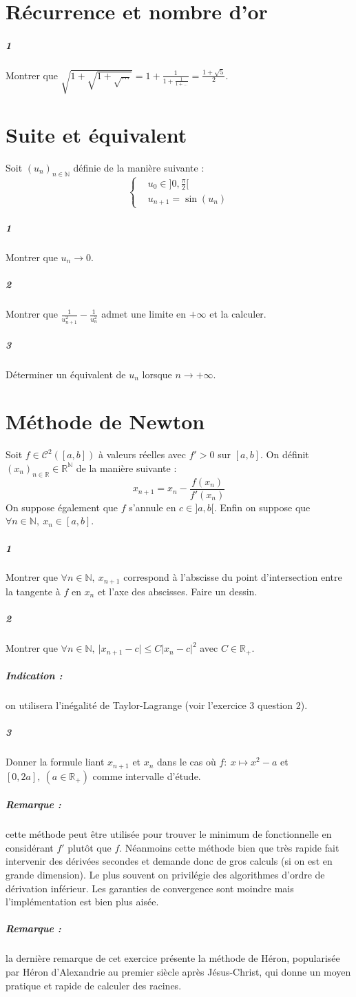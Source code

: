 \documentclass[10pt,a4paper]{article}
\begin{document}
\section{Récurrence et nombre d'or}
\subparagraph{1}Montrer que $\sqrt{1+\sqrt{1+\sqrt{\dots}}}=1+\frac{1}{1+\frac{1}{1+\dots}}=\frac{1+\sqrt{5}}{2}$.
\section{Suite et équivalent}
Soit $(u_n)_{n \in \mathbb{N}}$ définie de la manière suivante :
\begin{equation*}
\left\lbrace
\begin{aligned}
& u_0 \in ]0,\frac{\pi}{2}[\\
& u_{n+1}=\sin(u_n)
\end{aligned}
\right.
\end{equation*}
\subparagraph{1}Montrer que $u_n \rightarrow 0$.
\subparagraph{2}Montrer que $\frac{1}{u_{n+1}^2}-\frac{1}{u_n^2}$ admet une limite en $+\infty$ et la calculer.
\subparagraph{3}Déterminer un équivalent de $u_n$ lorsque $n \rightarrow +\infty$.
\section{Méthode de Newton}
Soit $f \in \mathcal{C}^2([a,b])$ à valeurs réelles avec $f'>0$ sur $[a,b]$. On définit $(x_n)_{n \in \mathbb{R}} \in \mathbb{R}^{\mathbb{N}}$ de la manière suivante :
\begin{equation*}
x_{n+1}=x_n-\frac{f(x_n)}{f'(x_{n})}
\end{equation*}
On suppose également que $f$ s'annule en $c \in ]a,b[$. Enfin on suppose que $\forall n \in \mathbb{N}, \ x_n \in [a,b]$.
\subparagraph{1}Montrer que $\forall n \in \mathbb{N}, \ x_{n+1}$ correspond à l'abscisse du point d'intersection entre la tangente à $f$ en $x_n$ et l'axe des abscisses. Faire un dessin.
\subparagraph{2}Montrer que $\forall n \in \mathbb{N}, \ \vert x_{n+1}-c \vert \le C \vert x_n-c \vert^2$ avec $C \in \mathbb{R}_+$.
\subparagraph{Indication :} on utilisera l'inégalité de Taylor-Lagrange (voir l'exercice 3 question 2).
\subparagraph{3}Donner la formule liant $x_{n+1}$ et $x_n$ dans le cas où $f : \ x \mapsto x^2-a$ et $[0,2a], \ (a\in\mathbb{R}_+)$ comme intervalle d'étude.
\subparagraph{Remarque :} cette méthode peut être utilisée pour trouver le minimum de fonctionnelle en considérant $f'$ plutôt que $f$. Néanmoins cette méthode bien que très rapide fait intervenir des dérivées secondes et demande donc de gros calculs (si on est en grande dimension). Le plus souvent on privilégie des algorithmes d'ordre de dérivation inférieur. Les garanties de convergence sont moindre mais l'implémentation est bien plus aisée.
\subparagraph{Remarque :} la dernière remarque de cet exercice présente la méthode de Héron, popularisée par Héron d'Alexandrie au premier siècle après Jésus-Christ, qui donne un moyen pratique et rapide de calculer des racines.
\end{document}
